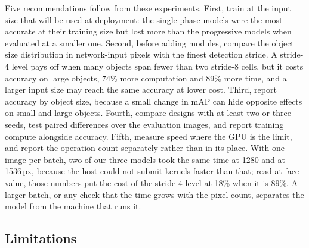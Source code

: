 \documentclass[preprint,12pt]{elsarticle}
\begin{document}
Five recommendations follow from these experiments. First, train at the input size
that will be used at deployment: the single-phase models were the most accurate at
their training size but lost more than the progressive models when evaluated at a
smaller one. Second, before adding modules, compare the object size distribution in
network-input pixels with the finest detection stride. A stride-4 level pays off
when many objects span fewer than two stride-8 cells, but it costs accuracy on
large objects, 74\% more computation and 89\% more time, and a larger input size
may reach the same accuracy at lower cost. Third, report accuracy by object size,
because a small change in mAP can hide opposite effects on small and large
objects. Fourth, compare designs with at least two or three seeds, test paired
differences over the evaluation images, and report training compute alongside
accuracy. Fifth, measure speed where the GPU is the limit, and report the
operation count separately rather than in its place. With one image per batch,
two of our three models took the same time at 1280 and at 1536\,px, because the
host could not submit kernels faster than that; read at face value, those numbers
put the cost of the stride-4 level at 18\% when it is 89\%. A larger batch, or any
check that the time grows with the pixel count, separates the model from the
machine that runs it.

\subsection{Limitations}
\end{document}

